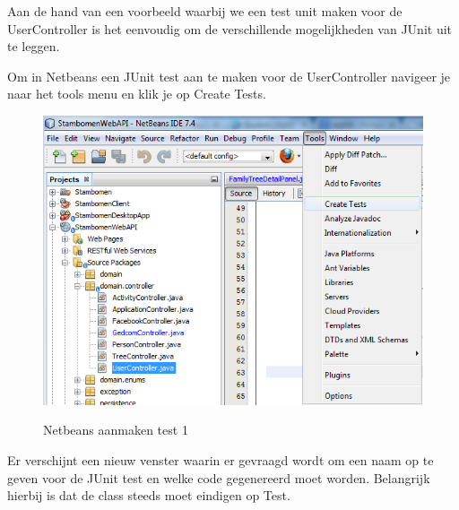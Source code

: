 \documentclass[pdftex,a4paper,12pt,twoside]{report}
\begin{document}
Aan de hand van een voorbeeld waarbij we een test unit maken voor de UserController is het eenvoudig om de verschillende mogelijkheden van JUnit uit te leggen.

Om in Netbeans een JUnit test aan te maken voor de UserController navigeer je naar het tools menu en klik je op Create Tests.

\begin{figure}[!htb]
\includegraphics{images/netbeansjunit.png}\\
\caption{Netbeans aanmaken test 1}
\end{figure}

Er verschijnt een nieuw venster waarin er gevraagd wordt om een naam op te geven voor de JUnit test en welke code gegenereerd moet worden. Belangrijk hierbij is dat de class steeds moet eindigen op Test.
\end{document}
